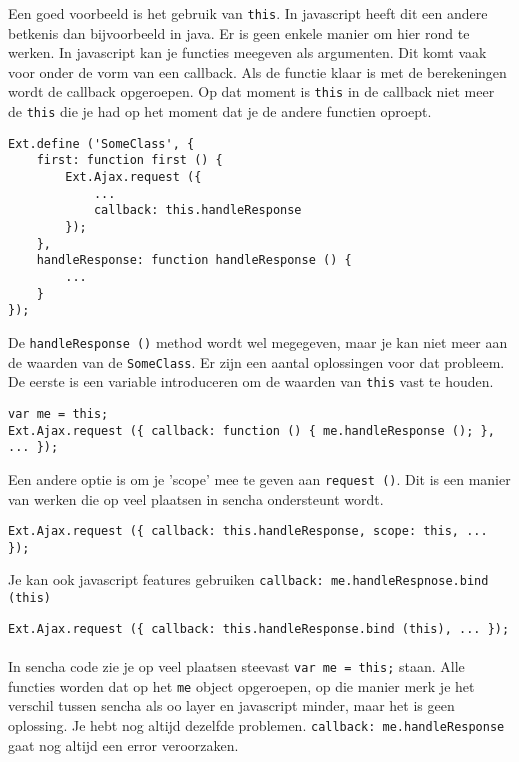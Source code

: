 Een goed voorbeeld is het gebruik van \lstinline{this}. In javascript heeft dit een andere
betkenis dan bijvoorbeeld in java. Er is geen enkele manier om hier rond te werken. In
javascript kan je functies meegeven als argumenten. Dit komt vaak voor onder de vorm van
een callback. Als de functie klaar is met de berekeningen wordt de callback opgeroepen. Op
dat moment is \lstinline{this} in de callback niet meer de \lstinline{this} die je had op
het moment dat je de andere functien oproept.

\begin{lstlisting}[language=ownjavascript]
Ext.define ('SomeClass', {
	first: function first () {
		Ext.Ajax.request ({
			...
			callback: this.handleResponse
		});
	},
	handleResponse: function handleResponse () {
		...
	}
});
\end{lstlisting}

De \lstinline{handleResponse ()} method wordt wel megegeven, maar je kan niet meer aan de
waarden van de \lstinline{SomeClass}. Er zijn een aantal oplossingen voor dat probleem. De
eerste is een variable introduceren om de waarden van \lstinline{this} vast te houden.

\begin{lstlisting}[language=ownjavascript]
var me = this;
Ext.Ajax.request ({ callback: function () { me.handleResponse (); }, ... });
\end{lstlisting}

Een andere optie is om je 'scope' mee te geven aan \lstinline{request ()}. Dit is een
manier van werken die op veel plaatsen in sencha ondersteunt wordt.

\begin{lstlisting}[language=ownjavascript]
Ext.Ajax.request ({ callback: this.handleResponse, scope: this, ... });
\end{lstlisting}

Je kan ook javascript features gebruiken \lstinline{callback: me.handleRespnose.bind (this)}

\begin{lstlisting}[language=ownjavascript]
Ext.Ajax.request ({ callback: this.handleResponse.bind (this), ... });
\end{lstlisting}


\paragraph {} In sencha code zie je op veel plaatsen steevast \lstinline{var me = this;}
staan. Alle functies worden dat op het \lstinline{me} object opgeroepen, op die manier
merk je het verschil tussen sencha als oo layer en javascript minder, maar het is geen
oplossing. Je hebt nog altijd dezelfde problemen. \lstinline{callback: me.handleResponse}
gaat nog altijd een error veroorzaken.


